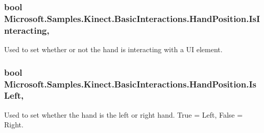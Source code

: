 \hypertarget{class_microsoft_1_1_samples_1_1_kinect_1_1_basic_interactions_1_1_hand_position_a6dc4ed8d8f34c25c6e9eff3af9199fa5}{
\subsubsection[{Is\-Interacting}]{\setlength{\rightskip}{0pt plus 5cm}bool Microsoft.\-Samples.\-Kinect.\-Basic\-Interactions.\-Hand\-Position.\-Is\-Interacting\hspace{0.3cm}{\ttfamily [get]}, {\ttfamily [set]}}}\label{class_microsoft_1_1_samples_1_1_kinect_1_1_basic_interactions_1_1_hand_position_a6dc4ed8d8f34c25c6e9eff3af9199fa5}


Used to set whether or not the hand is interacting with a U\-I element. 

\hypertarget{class_microsoft_1_1_samples_1_1_kinect_1_1_basic_interactions_1_1_hand_position_ae9e3aa977c7e7b9ec88906423fc995a9}{
\subsubsection[{Is\-Left}]{\setlength{\rightskip}{0pt plus 5cm}bool Microsoft.\-Samples.\-Kinect.\-Basic\-Interactions.\-Hand\-Position.\-Is\-Left\hspace{0.3cm}{\ttfamily [get]}, {\ttfamily [set]}}}\label{class_microsoft_1_1_samples_1_1_kinect_1_1_basic_interactions_1_1_hand_position_ae9e3aa977c7e7b9ec88906423fc995a9}


Used to set whether the hand is the left or right hand. True = Left, False = Right. 

